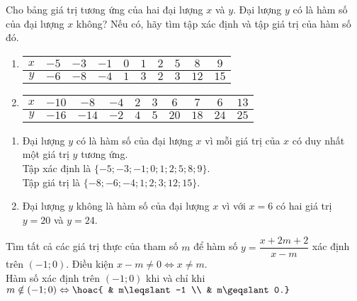 \begin{vd}%
	Cho bảng giá trị tương ứng của hai đại lượng $x$ và $y$. Đại lượng $y$ có là hàm số của đại lượng $x$ không? Nếu có, hãy tìm tập xác định và tập giá trị của hàm số đó.
	\begin{enumerate}
		\item
		\begin{tabular}{|c|c|c|c|c|c|c|c|c|c|}
			\hline
			$x$ & $-5$ & $-3$ & $-1$ & $0$ & $1$ & $2$ & $5$ & $8$ & $9$ \\
			\hline
			$y$ & $-6$ & $-8$ & $-4$ & $1$ & $3$ & $2$ & $3$ & $12$ & $15$ \\
			\hline
		\end{tabular}
		\item
		\begin{tabular}{|c|c|c|c|c|c|c|c|c|c|}
			\hline
			$x$ & $-10$ & $-8$ & $-4$ & $2$ & $3$ & $6$ & $7$ & $6$ & $13$ \\
			\hline
			$y$ & $-16$ & $-14$ & $-2$ & $4$ & $5$ & $20$ & $18$ & $24$ & $25$ \\
			\hline
		\end{tabular}
	\end{enumerate}
	\loigiai
	{
		\begin{enumerate}
			\item Đại lượng $y$ có là hàm số của đại lượng $x$ vì mỗi giá trị của $x$ có duy nhất một giá trị $y$ tương ứng. \\
			Tập xác định là $\{-5;-3;-1;0;1;2;5;8;9\}$. \\
			Tập giá trị là $\{-8;-6;-4;1;2;3;12;15\}$.
			\item Đại lượng $y$ không là hàm số của đại lượng $x$ vì với $x=6$ có hai giá trị $y=20$ và $y=24$.
		\end{enumerate}
	}
\end{vd}

\begin{vd}%
	Tìm tất cả các giá trị thực của tham số $m$ để hàm số $y=\dfrac{x+2m+2}{x-m}$ xác định trên $(-1;0)$. 
	\loigiai
	{
		Điều kiện $x-m\neq0 \Leftrightarrow x\neq m$. \\
		Hàm số xác định trên $(-1;0)$ khi và chỉ khi $m\notin(-1;0) \Leftrightarrow \hoac{ & m\leqslant-1 \\ & m\geqslant0.}$
	}
\end{vd}

